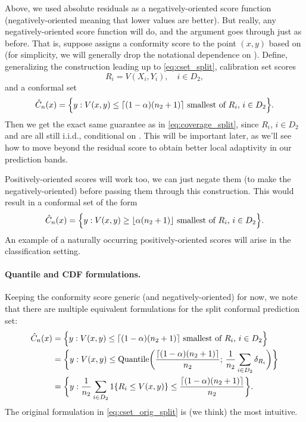 \documentclass{article}
\begin{document}
Above, we used absolute residuals as a negatively-oriented score function
(negatively-oriented meaning that lower values are better). But really, any
negatively-oriented score function will do, and the argument goes through
just as before. That is, suppose  assigns
a conformity score to the point $(x,y)$ based on  (for
simplicity, we will generally drop the notational dependence on
). Define, generalizing the construction leading up to
\eqref{eq:cset_split}, calibration set scores
\[
R_i = V(X_i,Y_i), \quad i \in D_2, 
\]
and a conformal set
\[
\hat{C}_n(x) = \Big\{ y : \text{$V(x,y) \leq \lceil (1-\alpha)(n_2+1) \rceil$
  smallest of $R_i$, $i \in D_2$} \Big\}. 
\]
Then we get the exact same guarantee as in \eqref{eq:coverage_split}, since
$R_i$, $i \in D_2$ and  are all still
i.i.d., conditional on . This will be important later, as
we'll see how to move beyond the residual score to obtain better local
adaptivity in our prediction bands.        

Positively-oriented scores will work too, we can just negate them (to
make the negatively-oriented) before passing them through this
construction. This would result in a conformal set of the form
\[
\hat{C}_n(x) = \Big\{ y : \text{$V(x,y) \geq \lfloor \alpha (n_2+1) \rfloor$
  smallest of $R_i$, $i \in D_2$} \Big\}.  
\]
An example of a naturally occurring positively-oriented scores will arise in the   
classification setting.

\paragraph{Quantile and CDF formulations.}

Keeping the conformity score generic (and negatively-oriented) for now, we note
that there are multiple equivalent formulations for the split conformal
prediction set:  
\begin{align}
\label{eq:cset_orig_split}
\hat{C}_n(x) 
&= \Big\{ y : \text{$V(x,y) \leq \lceil (1-\alpha)(n_2+1) \rceil$ smallest of
  $R_i$, $i \in D_2$} \Big\} \\  
\label{eq:cset_quant_split}
&= \bigg\{ y : V(x,y) \leq \mathrm{Quantile}\bigg( \frac{\lceil (1-\alpha)(n_2+1)
  \rceil}{n_2}; \, \frac{1}{n_2} \sum_{i \in D_2} \delta_{R_i} \bigg) \bigg\} \\
\label{eq:cset_cdf_split}
&= \bigg\{ y : \frac{1}{n_2} \sum_{i \in D_2} 1\{ R_i \leq V(x,y) \} \leq
  \frac{\lceil (1-\alpha)(n_2+1) \rceil}{n_2} \bigg\}.   
\end{align}
The original formulation in \eqref{eq:cset_orig_split} is (we think) the most
intuitive. 
\end{document}
